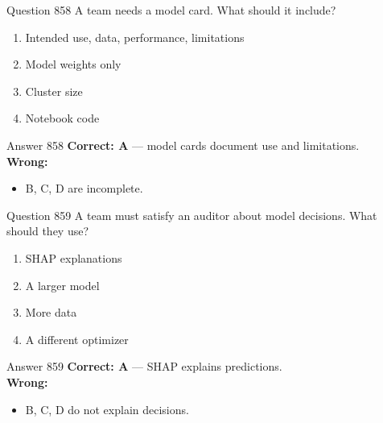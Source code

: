 \documentclass[aspectratio=169,11pt]{beamer}
\begin{document}
	\begin{frame}{Question 858}
		A team needs a model card. What should it include?
		\begin{enumerate}[label=\Alph*.]
			\item Intended use, data, performance, limitations
			\item Model weights only
			\item Cluster size
			\item Notebook code
		\end{enumerate}
	\end{frame}
	\begin{frame}{Answer 858}
		\textbf{Correct: A} --- model cards document use and limitations.\\
		\vspace{0.5em}
		\textbf{Wrong:}
		\begin{itemize}
			\item B, C, D are incomplete.
		\end{itemize}
	\end{frame}
	
	\begin{frame}{Question 859}
		A team must satisfy an auditor about model decisions. What should they use?
		\begin{enumerate}[label=\Alph*.]
			\item SHAP explanations
			\item A larger model
			\item More data
			\item A different optimizer
		\end{enumerate}
	\end{frame}
	\begin{frame}{Answer 859}
		\textbf{Correct: A} --- SHAP explains predictions.\\
		\vspace{0.5em}
		\textbf{Wrong:}
		\begin{itemize}
			\item B, C, D do not explain decisions.
		\end{itemize}
	\end{frame}
	
\end{document}
